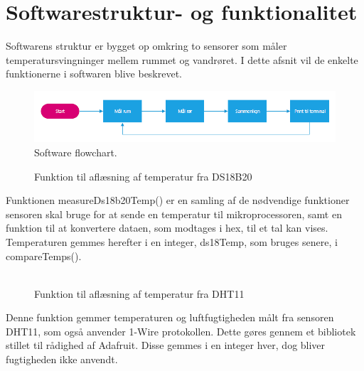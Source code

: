 \section{Softwarestruktur- og funktionalitet}
Softwarens struktur er bygget op omkring to sensorer som måler temperatursvingninger mellem rummet og vandrøret. I dette afsnit vil de enkelte funktionerne i softwaren blive beskrevet. 
\begin{figure}[h!]
  \centering
  \includegraphics[width=1\textwidth]{figures/Fase1software.png}
  \caption{Software flowchart.}
  \label{fase1flow}
\end{figure}

\begin{figure}[h!]
  \centering
  \caption{Funktion til aflæsning af temperatur fra DS18B20}
  \label{ds18b20Measure}
\end{figure}
Funktionen measureDs18b20Temp() er en samling af de nødvendige funktioner sensoren skal bruge for at sende en temperatur til mikroprocessoren, samt en funktion til at konvertere dataen, som modtages i hex, til et tal kan vises.\newline
Temperaturen gemmes herefter i en integer, ds18Temp, som bruges senere, i compareTemps().\\\\

\begin{figure}[h!]
  \centering
  \caption{Funktion til aflæsning af temperatur fra DHT11}
  \label{dht11Measure}
\end{figure}
Denne funktion gemmer temperaturen og luftfugtigheden målt fra sensoren DHT11, som også anvender 1-Wire protokollen. Dette gøres gennem et bibliotek stillet til rådighed af Adafruit.\newline
Disse gemmes i en integer hver, dog bliver fugtigheden ikke anvendt.

